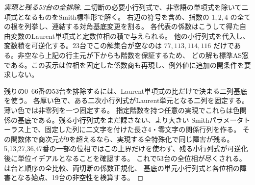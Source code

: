\begin{proof}[実現と残る53台の全排除]
二切断の必要小行列式で、非零語の単項式を除いて二項式となるものをSmith標準形で解く。
右辺の符号を含め、指数の $1,2,4$ の全ての根を列挙し、連結する対角基底変更を割る。
各代表の係数はこうして得た自由変数のLaurent単項式と定数位相の積で与えられる。
他の小行列式を代入し、変数積を可逆化する。23台でこの解集合が空なのは
$77,113,114,116$ だけである。非空なら上記の行主元が下からも階数を保証するため、
どの解も標準AS窓である。この表示は位相を固定した係数商も再現し、例外値に追加の開条件を要求しない。

残りの0--66番の53台を排除するには、Laurent単項式の比だけで決まる二列基底を使う。
各厚い色で、ある二次小行列式がLaurent単元となる二列を固定する。薄い色では非零列を一つ固定する。
指定階数を持つ任意の実現でこれらは色関係の基底である。残る小行列式をまだ課さない、より大きい
Smithパラメータトーラス上で、固定した列に二文字を付けた長さ4・零文字の関係行列を作る。
その関数体で商次元が9を超えるなら、実現する全特殊化で同じ障害が残る。
5,13,27,36,47番の一部の位相ではこの上界だけを使わず、残る小行列式が可逆化後に単位イデアルとなることを確認する。
これで53台の全位相が尽くされる。
 は台と順序の全比較、両切断の係数正規化、
基底の単元小行列式と各位相の障害となる始点、19台の非空性を検算する。
\end{proof}
